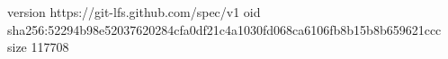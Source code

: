 version https://git-lfs.github.com/spec/v1
oid sha256:52294b98e52037620284cfa0df21c4a1030fd068ca6106fb8b15b8b659621ccc
size 117708
